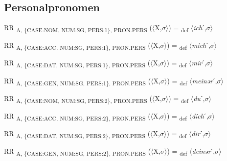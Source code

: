 {\subsection{Personalpronomen}

\begin{exe}
 RR \textsubscript{A, \{CASE:NOM, NUM:SG, PERS:1\}, PRON.PERS} ($\langle$X,$\sigma $$\rangle$) = \textsubscript{def} $\langle$\textit{ich}ˊ,$\sigma $$\rangle$
\end{exe}

\begin{exe}
 RR \textsubscript{A, \{CASE:ACC, NUM:SG, PERS:1\}, PRON.PERS} ($\langle$X,$\sigma $$\rangle$) = \textsubscript{def} $\langle$\textit{mich}ˊ,$\sigma $$\rangle$
\end{exe}

\begin{exe}
 RR \textsubscript{A, \{CASE:DAT, NUM:SG, PERS:1\}, PRON.PERS} ($\langle$X,$\sigma $$\rangle$) = \textsubscript{def} $\langle$\textit{mir}ˊ,$\sigma $$\rangle$
\end{exe}

\begin{exe}
 RR \textsubscript{A, \{CASE:GEN, NUM:SG, PERS:1\}, PRON.PERS} ($\langle$X,$\sigma $$\rangle$) = \textsubscript{def} $\langle$\textit{meinər}ˊ,$\sigma $$\rangle$
\end{exe}

\begin{exe}
 RR \textsubscript{A, \{CASE:NOM, NUM:SG, PERS:2\}, PRON.PERS} ($\langle$X,$\sigma $$\rangle$) = \textsubscript{def} $\langle$\textit{du}ˊ,$\sigma $$\rangle$
\end{exe}

\begin{exe}
 RR \textsubscript{A, \{CASE:ACC, NUM:SG, PERS:2\}, PRON.PERS} ($\langle$X,$\sigma $$\rangle$) = \textsubscript{def} $\langle$\textit{dich}ˊ,$\sigma $$\rangle$
\end{exe}

\begin{exe}
 RR \textsubscript{A, \{CASE:DAT, NUM:SG, PERS:2\}, PRON.PERS} ($\langle$X,$\sigma $$\rangle$) = \textsubscript{def} $\langle$\textit{dir}ˊ,$\sigma $$\rangle$
\end{exe}

\begin{exe}
 RR \textsubscript{A, \{CASE:GEN, NUM:SG, PERS:2\}, PRON.PERS} ($\langle$X,$\sigma $$\rangle$) = \textsubscript{def} $\langle$\textit{deinər}ˊ,$\sigma $$\rangle$
\end{exe}

}
